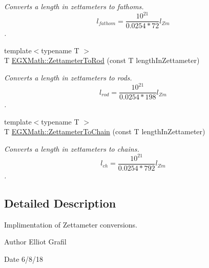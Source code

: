 \begin{DoxyCompactItemize}
\begin{DoxyCompactList}\small\item\em Converts a length in zettameters to fathoms. \[ l_{fathom}= \frac{10^{21}}{0.0254 * 72} l_{Zm} \]. \end{DoxyCompactList}\item 
{\footnotesize template$<$typename T $>$ }\\T \mbox{\hyperlink{group___e_g_x_math-_conversions-_length_conversions-_s_i-_zettameter-_surveyors_gac9031bf1465b8a56ab426ac20d256741}{E\+G\+X\+Math\+::\+Zettameter\+To\+Rod}} (const T length\+In\+Zettameter)
\begin{DoxyCompactList}\small\item\em Converts a length in zettameters to rods. \[ l_{rod}= \frac{10^{21}}{0.0254 * 198} l_{Zm} \]. \end{DoxyCompactList}\item 
{\footnotesize template$<$typename T $>$ }\\T \mbox{\hyperlink{group___e_g_x_math-_conversions-_length_conversions-_s_i-_zettameter-_surveyors_ga97af95fc842ded65d430a539ef8a3571}{E\+G\+X\+Math\+::\+Zettameter\+To\+Chain}} (const T length\+In\+Zettameter)
\begin{DoxyCompactList}\small\item\em Converts a length in zettameters to chains. \[ l_{ch}= \frac{10^{21}}{0.0254 * 792} l_{Zm} \]. \end{DoxyCompactList}\end{DoxyCompactItemize}


\subsection{Detailed Description}
Implimentation of Zettameter conversions. 

\begin{DoxyAuthor}{Author}
Elliot Grafil 
\end{DoxyAuthor}
\begin{DoxyDate}{Date}
6/8/18 
\end{DoxyDate}
